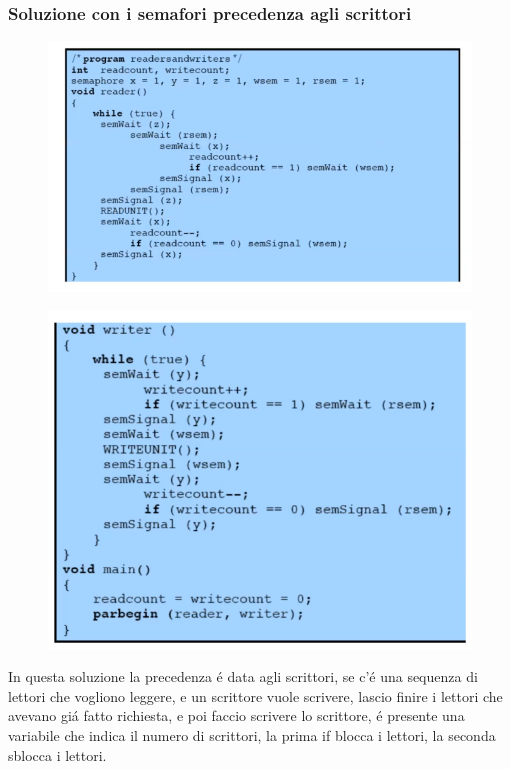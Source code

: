 \subsubsection*{Soluzione con i semafori precedenza agli scrittori}
\begin{figure}[H]
    \centering
    \includegraphics[width=0.7\linewidth]{immagini/ScrittoriLettoriSemaforiPrecScrittori}
\end{figure}
\begin{figure}[H]
    \centering
    \includegraphics[width=0.7\linewidth]{immagini/ScrittoriLettoriPrecScrittori2}
\end{figure}
In questa soluzione la precedenza é data agli scrittori, se c'é una sequenza di lettori che vogliono leggere, e un scrittore vuole scrivere,
lascio finire i lettori che avevano giá fatto richiesta, e poi faccio scrivere lo scrittore, é presente una variabile che indica il numero di
scrittori, la prima if blocca i lettori, la seconda sblocca i lettori.
